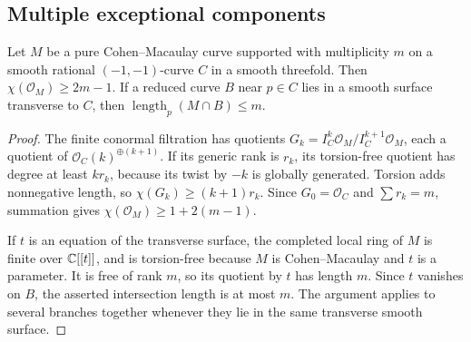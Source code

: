 \subsection{Multiple exceptional components}
\begin{lemma}\label{lem:multiple}
Let $M$ be a pure Cohen--Macaulay curve supported with multiplicity
$m$ on a smooth rational $(-1,-1)$-curve $C$ in a smooth threefold.
Then $\chi(\mathcal O_M)\ge2m-1$. If a reduced curve $B$ near
$p\in C$ lies in a smooth surface transverse to $C$, then
$\operatorname{length}_p(M\cap B)\le m$.
\end{lemma}
\begin{proof}
The finite conormal filtration has quotients
$G_k=I_C^k\mathcal O_M/I_C^{k+1}\mathcal O_M$, each a quotient of
$\mathcal O_C(k)^{\oplus(k+1)}$. If its generic rank is $r_k$,
its torsion-free quotient has degree at least $kr_k$, because its
twist by $-k$ is globally generated. Torsion adds nonnegative length,
so $\chi(G_k)\ge(k+1)r_k$. Since $G_0=\mathcal O_C$ and
$\sum r_k=m$, summation gives $\chi(\mathcal O_M)\ge1+2(m-1)$.

If $t$ is an equation of the transverse surface, the completed local
ring of $M$ is finite over $\mathbb C[[t]]$, and is torsion-free because
$M$ is Cohen--Macaulay and $t$ is a parameter. It is free of rank
$m$, so its quotient by $t$ has length $m$. Since $t$ vanishes on
$B$, the asserted intersection length is at most $m$. The argument
applies to several branches together whenever they lie in the same
transverse smooth surface.
\end{proof}

